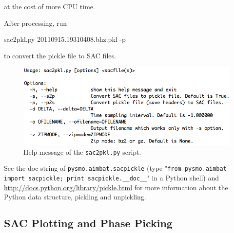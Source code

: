 \documentclass[12pt, titlepage]{article}
\newenvironment{lyxcode}
{\begin{list}{}{
\setlength{\rightmargin}{\leftmargin}
\setlength{\listparindent}{0pt}%
\raggedright
\setlength{\itemsep}{0pt}
\setlength{\parsep}{0pt}
\normalfont\ttfamily}%
 \item[]}
{\end{list}}
\begin{document}
at the cost of more CPU time.

After processing, run

\begin{lyxcode}
sac2pkl.py 20110915.19310408.bhz.pkl -p
\end{lyxcode}

to convert the pickle file to SAC files.

\begin{figure}[!h]
    \centering
    \vspace{1em}
    \includegraphics[width = 0.94 \textwidth]{figs/help-sac2pkl.png}
    \caption{Help message of the \texttt{sac2pkl.py} script. }
    \label{fig:help-sac2pkl}
\end{figure}

See the doc string of \texttt{pysmo.aimbat.sacpickle} (type "\texttt{from pysmo.aimbat import sacpickle; print sacpickle.\_\_doc\_\_}" in a Python shell) and 
\url{http://docs.python.org/library/pickle.html}
for more information about the Python data structure, pickling and unpickling.










\subsection{SAC Plotting and Phase Picking}
\end{document}

